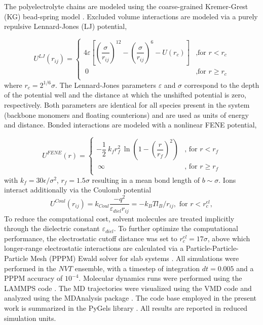 \documentclass[twoside,twocolumn,9pt]{article}
\begin{document}
The polyelectrolyte chains are modeled using the coarse-grained Kremer-Grest (KG) bead-spring model \cite{Kremer_1990}. Excluded volume interactions are modeled via a purely repulsive Lennard-Jones (LJ) potential, 

\begin{equation}\label{eq:lj_explain}
  U^{LJ}(r_{ij}) =
  \begin{cases}
    4 \varepsilon\left[\left( \dfrac{\sigma}{r_{ij}}\right)^{12} - \left(\dfrac{\sigma}{r_{ij}}\right)^{6}- U(r_c) \right] & \text{,for $r<r_c$} \\
    \ 0 & \text{,for $r \geq r_c$} \\
  \end{cases}
\end{equation}
where $r_c = 2^{1/6}\sigma$. The Lennard-Jones parameters $\varepsilon$ and $\sigma$ correspond to the depth of the potential well and the distance at which the unshifted potential is zero, respectively. Both parameters are identical for all species present in the system (backbone monomers and floating counterions) and are used as units of energy and distance. Bonded interactions are modeled with a nonlinear FENE potential,

\begin{equation}\label{eq:fene_explain}
  U^{FENE}(r) =
  \begin{cases}
    - \dfrac{1}{2}\ k_f r_f^2 \  \ln \left( 1 -  \left(\dfrac{r}{r_f}\right)^2\right) & \text{, for $r<r_f$} \\
    \ \infty & \text{, for $r \geq r_f$} \\
  \end{cases}
\end{equation}
with $k_f =  30 \epsilon/\sigma^2$, $r_f = 1.5 \sigma $ resulting in a mean bond length of $b \sim \sigma$. Ions interact additionally via the Coulomb potential
\begin{equation}\label{eq:coul_explain}
    U^{Coul}(r_{ij}) = k_{Coul} \dfrac{-q^2}{\varepsilon_{diel} r_{ij}} = -k_BT l_B/r_{ij},\text{ for $r<r^{el}_c$},
\end{equation}
To reduce the computational cost, solvent molecules are treated implicitly through the dielectric constant $\varepsilon_{diel}$.  
To further optimize the computational performance, the electrostatic cutoff distance was set to $r^{el}_c = 17 \sigma$, above which longer-range electrostatic interactions are calculated via a Particle-Particle-Particle Mesh (PPPM) Ewald solver for slab systems \cite{Yeh_1999, Hockney_1988}.  All simulations were performed in the $NVT$ ensemble, with a timestep of integration $dt = 0.005$ and a PPPM accuracy of $10^{-4}$. Molecular dynamics runs were performed using the LAMMPS code \cite{Plimpton_1995}. The MD trajectories were visualized using the VMD code \cite{Humphrey_1996} and analyzed using the MDAnalysis package 
\cite{Khoshlessan_2017,Michaud_Agrawal_2011}. The code base employed in the present work is summarized in the PyGels library \cite{Vasilii2018}. All results are reported in reduced simulation units.
\end{document}
